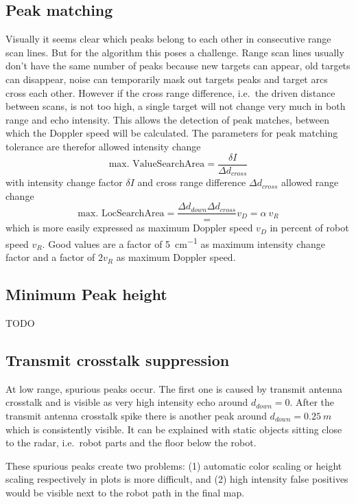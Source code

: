 \subsection{Peak matching}\label{peak-matching}

Visually it seems clear which peaks belong to each other in consecutive
range scan lines. But for the algorithm this poses a challenge. Range
scan lines usually don't have the same number of peaks because new
targets can appear, old targets can disappear, noise can temporarily
mask out targets peaks and target arcs cross each other. However if the
cross range difference, i.e.~the driven distance between scans, is not
too high, a single target will not change very much in both range and
echo intensity. This allows the detection of peak matches, between which
the Doppler speed will be calculated. The parameters for peak matching
tolerance are therefor allowed intensity change
\[
    \text{max. ValueSearchArea} = \frac{\delta I}{\Delta d_{cross}}
\]
with intensity change factor \(\delta I\) and cross range difference
\(\Delta d_{cross}\) allowed range change
\[
    \text{max. LocSearchArea} = \frac{\Delta d_{down}{\Delta d_{cross}}} = v_D = \alpha~v_R
\]
which is more easily expressed as maximum Doppler speed \(v_D\) in
percent of robot speed \(v_R\). Good values are a factor of
\SI{5}{cm^{-1}} as maximum intensity change factor and a factor of
\(2 v_R\) as maximum Doppler speed.

\subsection{Minimum Peak height}\label{minimum-peak-height}
TODO

\subsection{Transmit crosstalk suppression}\label{transmit-crosstalk-suppression}

At low range, spurious peaks occur. The first one is caused by transmit
antenna crosstalk and is visible as very high intensity echo around
\(d_{down}=0\). After the transmit antenna crosstalk spike there is
another peak around \(d_{down}=\SI{0.25}{m}\) which is consistently visible. It
can be explained with static objects sitting close to the radar,
i.e.~robot parts and the floor below the robot.

These spurious peaks create two problems: (1) automatic color scaling or
height scaling respectively in plots is more difficult, and (2) high
intensity false positives would be visible next to the robot path in the
final map.

